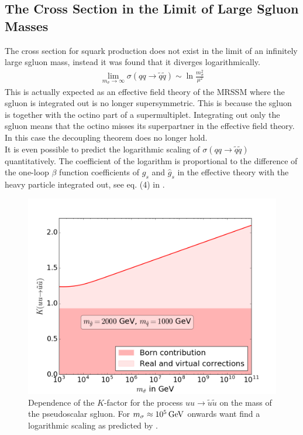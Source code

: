 \subsection{The Cross Section in the Limit of Large Sgluon Masses}
The cross section for squark production does not exist in the limit of an infinitely large sgluon mass, instead it was found that it diverges logarithmically.\\
\begin{align}
\lim_{m_{\sigma}\to\infty} \sigma(qq \to \tilde{q}\tilde{q}) \sim \ln \frac{m_{\sigma}^2}{\mu^2}
\end{align}
This is actually expected as an effective field theory of the MRSSM where the sgluon is integrated out is no longer supersymmetric. This is because the sgluon is together with the octino part of a supermultiplet. Integrating out only the sgluon means that the octino misses its superpartner in the effective field theory. In this case the decoupling theorem \cite{Appelquist:1974tg} does no longer hold.\\
It is even possible to predict the  logarithmic scaling of $\sigma(qq \to \tilde{q}\tilde{q})$ quantitatively. The coefficient of the logarithm is proportional to the difference of the one-loop $\beta$ function coefficients of $g_s$ and $\hat{g}_s$ in the effective theory with the heavy particle integrated out, see eq. (4) in \cite{Cheng:1997sq}.
\begin{figure}[!htpb]
\begin{center}
\includegraphics[scale=.5]{figures/MRSSM_uu_susu_Kfactors_msq=1000GeV_msg=2000GeV.png}
\caption{Dependence of the $K$-factor for the process $uu \to \tilde{u}\tilde{u}$ on the mass of the pseudoscalar sgluon. For $m_{\sigma} \approx \unit[10^5]{GeV}$ onwards want find a logarithmic scaling as predicted by \cite{Cheng:1997sq}.}
\end{center}
\end{figure}

